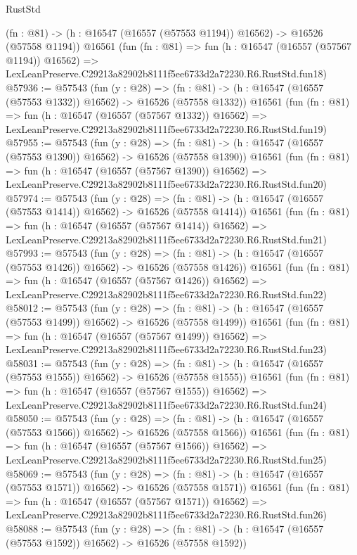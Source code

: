 \begin{lexlean}{RustStd}
\begin{coremodule}
    (fn : @81) -> (h : @16547 (@16557 (@57553 @1194)) @16562) -> @16526 (@57558 @1194))
    @16561
    (fun (fn : @81) =>
    fun (h : @16547 (@16557 (@57567 @1194)) @16562) =>
    LexLeanPreserve.C29213a82902b8111f5ee6733d2a72230.R6.RustStd.fun18)
@57936 := @57543
    (fun (y : @28) =>
    (fn : @81) -> (h : @16547 (@16557 (@57553 @1332)) @16562) -> @16526 (@57558 @1332))
    @16561
    (fun (fn : @81) =>
    fun (h : @16547 (@16557 (@57567 @1332)) @16562) =>
    LexLeanPreserve.C29213a82902b8111f5ee6733d2a72230.R6.RustStd.fun19)
@57955 := @57543
    (fun (y : @28) =>
    (fn : @81) -> (h : @16547 (@16557 (@57553 @1390)) @16562) -> @16526 (@57558 @1390))
    @16561
    (fun (fn : @81) =>
    fun (h : @16547 (@16557 (@57567 @1390)) @16562) =>
    LexLeanPreserve.C29213a82902b8111f5ee6733d2a72230.R6.RustStd.fun20)
@57974 := @57543
    (fun (y : @28) =>
    (fn : @81) -> (h : @16547 (@16557 (@57553 @1414)) @16562) -> @16526 (@57558 @1414))
    @16561
    (fun (fn : @81) =>
    fun (h : @16547 (@16557 (@57567 @1414)) @16562) =>
    LexLeanPreserve.C29213a82902b8111f5ee6733d2a72230.R6.RustStd.fun21)
@57993 := @57543
    (fun (y : @28) =>
    (fn : @81) -> (h : @16547 (@16557 (@57553 @1426)) @16562) -> @16526 (@57558 @1426))
    @16561
    (fun (fn : @81) =>
    fun (h : @16547 (@16557 (@57567 @1426)) @16562) =>
    LexLeanPreserve.C29213a82902b8111f5ee6733d2a72230.R6.RustStd.fun22)
@58012 := @57543
    (fun (y : @28) =>
    (fn : @81) -> (h : @16547 (@16557 (@57553 @1499)) @16562) -> @16526 (@57558 @1499))
    @16561
    (fun (fn : @81) =>
    fun (h : @16547 (@16557 (@57567 @1499)) @16562) =>
    LexLeanPreserve.C29213a82902b8111f5ee6733d2a72230.R6.RustStd.fun23)
@58031 := @57543
    (fun (y : @28) =>
    (fn : @81) -> (h : @16547 (@16557 (@57553 @1555)) @16562) -> @16526 (@57558 @1555))
    @16561
    (fun (fn : @81) =>
    fun (h : @16547 (@16557 (@57567 @1555)) @16562) =>
    LexLeanPreserve.C29213a82902b8111f5ee6733d2a72230.R6.RustStd.fun24)
@58050 := @57543
    (fun (y : @28) =>
    (fn : @81) -> (h : @16547 (@16557 (@57553 @1566)) @16562) -> @16526 (@57558 @1566))
    @16561
    (fun (fn : @81) =>
    fun (h : @16547 (@16557 (@57567 @1566)) @16562) =>
    LexLeanPreserve.C29213a82902b8111f5ee6733d2a72230.R6.RustStd.fun25)
@58069 := @57543
    (fun (y : @28) =>
    (fn : @81) -> (h : @16547 (@16557 (@57553 @1571)) @16562) -> @16526 (@57558 @1571))
    @16561
    (fun (fn : @81) =>
    fun (h : @16547 (@16557 (@57567 @1571)) @16562) =>
    LexLeanPreserve.C29213a82902b8111f5ee6733d2a72230.R6.RustStd.fun26)
@58088 := @57543
    (fun (y : @28) =>
    (fn : @81) -> (h : @16547 (@16557 (@57553 @1592)) @16562) -> @16526 (@57558 @1592))

\end{coremodule}
\end{lexlean}
